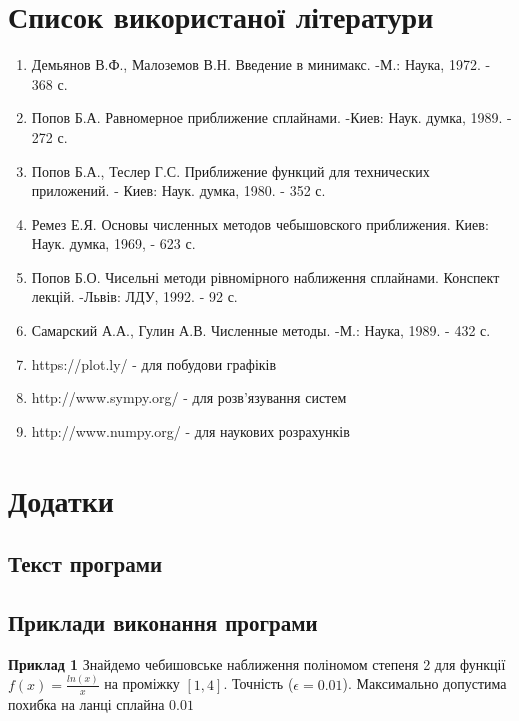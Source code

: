 \documentclass[ukrainian,14pt]{extarticle}
\begin{document}
\newpage

\section*{Список використаної літератури}

\begin{enumerate}
\item  Демьянов В.Ф., Малоземов В.Н. Введение в минимакс. -М.: Наука, 1972. - 368 с.
\item Попов Б.А. Равномерное приближение сплайнами. -Киев: Наук. думка, 1989. - 272 с.
\item Попов Б.А., Теслер Г.С. Приближение функций для технических приложений. - Киев: Наук. думка, 1980. - 352 с.
\item Ремез Е.Я. Основы численных методов чебышовского приближения. Киев: Наук. думка, 1969, - 623 с.
\item Попов Б.О. Чисельні методи рівномірного наближення сплайнами. Конспект лекцій. -Львів: ЛДУ, 1992. - 92 с.
\item Самарский А.А., Гулин А.В. Численные методы. -М.: Наука, 1989. - 432 с.
\item https://plot.ly/ - для побудови графіків
\item http://www.sympy.org/ - для розв'язування систем
\item http://www.numpy.org/ - для наукових розрахунків
\end{enumerate}

\newpage

\section{Додатки}
\subsection{Текст програми}


\newpage

\subsection{Приклади виконання програми}
\textbf{Приклад 1} 
Знайдемо чебишовське наближення поліномом степеня 2 для функції $f(x) = \frac{ln(x)}{x}$ на проміжку $[1, 4]$. Точність ($\epsilon = 0.01$). Максимально допустима похибка на ланці сплайна $0.01$
\end{document}
